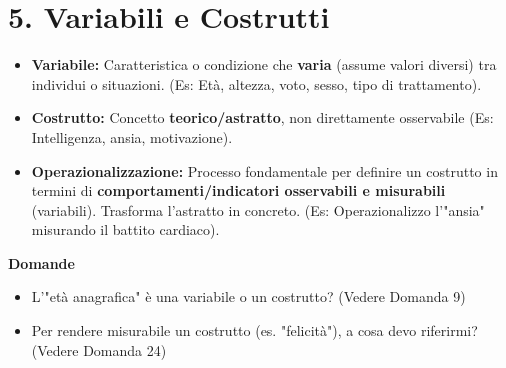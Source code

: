 \documentclass[12pt, a4paper]{article}
\newenvironment{reflectionbox}{%
    \begin{framed}\par\medskip\noindent
    \textbf{\color{boxtitlecolor}Domande} \par
    \begin{itemize}[leftmargin=*, label=$\blacktriangleright$]
}{%
    \end{itemize}\par\medskip
    \end{framed}
}
\begin{document}
\section*{5. Variabili e Costrutti}
\begin{itemize}
    \item \textbf{Variabile:} Caratteristica o condizione che \textbf{varia} (assume valori diversi) tra individui o situazioni. (Es: Età, altezza, voto, sesso, tipo di trattamento).
    \item \textbf{Costrutto:} Concetto \textbf{teorico/astratto}, non direttamente osservabile (Es: Intelligenza, ansia, motivazione).
    \item \textbf{Operazionalizzazione:} Processo fondamentale per definire un costrutto in termini di \textbf{comportamenti/indicatori osservabili e misurabili} (variabili). Trasforma l'astratto in concreto. (Es: Operazionalizzo l'"ansia" misurando il battito cardiaco).
\end{itemize}

\begin{reflectionbox}
    \item L'"età anagrafica" è una variabile o un costrutto? (Vedere Domanda 9)
    \item Per rendere misurabile un costrutto (es. "felicità"), a cosa devo riferirmi? (Vedere Domanda 24)
\end{reflectionbox}
\end{document}
